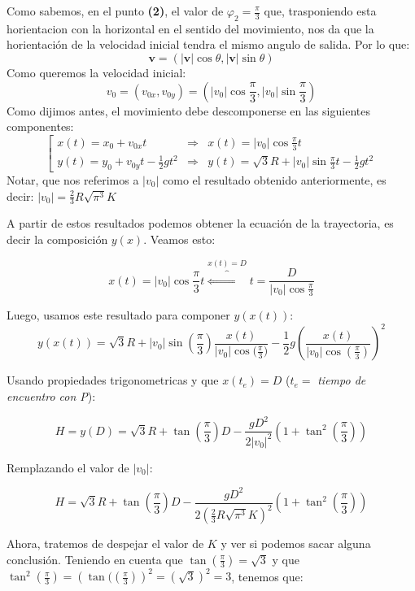 \documentclass[fleqn,10pt]{SelfArx} %
\newcommand{\sii}{\Longleftrightarrow}
\begin{document}
Como sabemos, en el punto \textbf{(2)}, el valor de ${\varphi}_2 = \frac{\pi}{3}$ que, trasponiendo esta horientacion con la horizontal en el sentido del movimiento, nos da que la horientación de la velocidad inicial tendra el mismo angulo de salida. Por lo que:
\[\textbf{v} = (|\textbf{v}| \cos{\theta}, |\textbf{v}| \sin{\theta})\]
Como queremos la velocidad inicial:  
\[ v_{0} = (v_{0x}, v_{0y} ) = (|v_0| \cos{\frac{\pi}{3}}, |v_0| \sin{\frac{\pi}{3}})\]
Como dijimos antes, el movimiento debe descomponerse en las siguientes componentes:
\[\left[ \begin{array}{lll}
 x(t) = x_0 + v_{0x} t & \Rightarrow & x(t) = |v_0| \cos{\frac{\pi}{3}} t\\
 y(t) = y_0 + v_{0y} t - \frac{1}{2} g t^2  & \Rightarrow & y(t) = \sqrt{3}R + |v_0| \sin{\frac{\pi}{3}} t - \frac{1}{2} g t^2
\end{array}\right. \]
Notar, que nos referimos a $|v_0|$ como el resultado obtenido anteriormente, es decir: $|v_0| = \frac{2}{3} R  \sqrt{ {\pi}^3} K$

A partir de estos resultados podemos obtener la ecuación de la trayectoria, es decir la composición $y(x)$. Veamos esto:

\[x(t) = |v_0| \cos{\frac{\pi}{3}} t \overbrace{\sii}^{x(t)=D} t = \frac{D}{|v_0| \cos{\frac{\pi}{3}}}\]

Luego, usamos este resultado para componer $y(x(t))$:
\[y(x(t)) = \sqrt{3}R + |v_0| \sin{( \frac{\pi}{3} )} \frac{x(t)}{|v_0| \cos{( \frac{\pi}{3}} ) } - \frac{1}{2} g \left( \frac{x(t)}{|v_0| \cos{( \frac{\pi}{3} )}}\right)^2\]

Usando propiedades trigonometricas y que $x(t_e)=D$ ($t_e = $ \textit{tiempo de encuentro con P}):

\[H = y(D) = \sqrt{3}R + \tan{( \frac{\pi}{3} )} D - \frac{g D^2}{2 |v_0|^2}  \left(1 + \tan^2{( \frac{\pi}{3} )}  \right)\]

Remplazando el valor de $|v_0|$:

\[H  = \sqrt{3}R + \tan{( \frac{\pi}{3} )} D - \frac{g D^2}{2 \left(\frac{2}{3} R  \sqrt{ {\pi}^3} K \right)^2}  \left(1 + \tan^2{( \frac{\pi}{3} )}  \right)\]

Ahora, tratemos de despejar el valor de $K$ y ver si podemos sacar alguna conclusión. Teniendo en cuenta que $\tan{( \frac{\pi}{3} )} =  \sqrt{3}$ y que $\tan^2{( \frac{\pi}{3} )} = (\tan{(( \frac{\pi}{3} )})^2 = (\sqrt{3})^2 = 3$, tenemos que:
\end{document}
